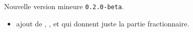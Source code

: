 Nouvelle version mineure \verb+0.2.0-beta+. 
    
\begin{itemize}[itemsep=.5em]
    \item {}
    	  ajout de , ,  et  qui donnent juste la partie fractionnaire.
\end{itemize}

\separation
